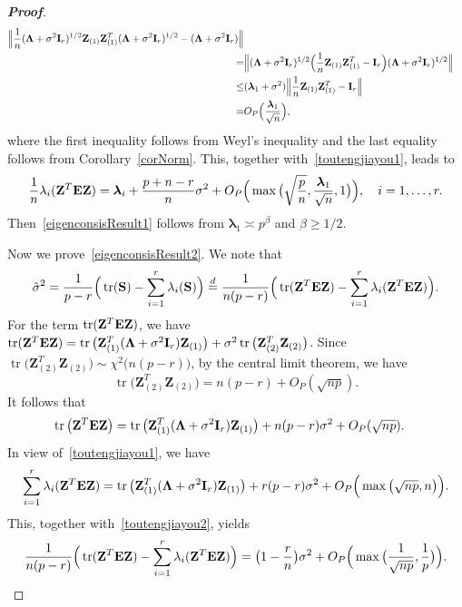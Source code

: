 \documentclass[3p]{elsarticle}
\DeclareMathOperator{\mytr}{tr}
\newcommand{\bZ}{\mathbf{Z}}
\newcommand{\bfsym}[1]{\ensuremath{\boldsymbol{#1}}}
\def\blambda {\bfsym {\lambda}}        \def\bLambda {\bfsym {\Lambda}}
\theoremstyle{plain}
\theoremstyle{definition}
\theoremstyle{remark}
\begin{document}
\begin{appendices}
\begin{proof}[\textbf{Proof}]
$$\begin{aligned}
        \Big\|
        \frac{1}{n}(\bLambda+\sigma^2 \BI_r)^{1/2}\bZ_{(1)}\bZ_{(1)}^T(\bLambda+\sigma^2 \BI_r)^{1/2}
        -(\bLambda+\sigma^2 \BI_r)
        \Big\|\\
        = &
        \Big\|
        (\bLambda+\sigma^2 \BI_r)^{1/2}\Big(\frac{1}{n}\bZ_{(1)}\bZ_{(1)}^T-\BI_r\Big)(\bLambda+\sigma^2 \BI_r)^{1/2}
        \Big\|\\
        \leq &
        (\blambda_1 + \sigma^2)
        \Big\|\frac{1}{n}\bZ_{(1)}\bZ_{(1)}^T-\BI_r\Big\|\\
        = &
        O_P\Big(\frac{\blambda_1}{\sqrt{n}}\Big),
    \end{aligned}
    $$
    where the first inequality follows from Weyl's inequality and the last equality follows from Corollary~\ref{corNorm}.
    This, together with~\eqref{toutengjiayou1}, leads to
$$
\frac{1}{n}\lambda_i(\BZ^T \BE \BZ)=
\blambda_i+\frac{p+n-r}{n}\sigma^2+O_P\Big(\max\big(\sqrt{\frac{p}{n}},\frac{\blambda_1}{\sqrt{n}},1\big)\Big),\quad i=1,\ldots, r.
$$
Then~\eqref{eigenconsisResult1} follows from $\blambda_1\asymp p^{\beta}$ and $\beta\geq 1/2$.
    
    Now we prove~\eqref{eigenconsisResult2}.
    We note that
    $$
    \hat{\sigma}^2=\frac{1}{p-r}\Big(\mytr(\BS)-\sum_{i=1}^r \lambda_i(\BS)\Big)
    \overset{d}{=}
\frac{1}{n(p-r)}\Big(\mytr(\BZ^T \BE \BZ)-\sum_{i=1}^r \lambda_i(\BZ^T \BE \BZ)\Big).
    $$
    For the term $\mytr(\BZ^T \BE \BZ)$, we have
    $
            \mytr(\bZ^T \BE \bZ)= \mytr\big(\bZ_{(1)}^T (\bLambda +\sigma^2 \BI_r) \bZ_{(1)}\big)+
       \sigma^2 \mytr\big( \bZ_{(2)}^T  \bZ_{(2)}\big)
    $.
    Since $\mytr\big( \bZ_{(2)}^T  \bZ_{(2)}\big)\sim \chi^2\big( n(p-r)\big)$, by the central limit theorem, we have
    $$\mytr\big( \bZ_{(2)}^T  \bZ_{(2)}\big)=n(p-r)+O_P(\sqrt{np}).$$
    It follows that
    \begin{equation}\label{toutengjiayou2}
        \begin{aligned}
            \mytr\big(\bZ^T \BE \bZ\big)&= \mytr\big(\bZ_{(1)}^T (\bLambda +\sigma^2 \BI_r) \bZ_{(1)}\big)+
            n(p-r)\sigma^2+O_P(\sqrt{np}).
        \end{aligned}
    \end{equation}
    In view of~\eqref{toutengjiayou1}, we have
    $$
\sum_{i=1}^r\lambda_i(\BZ^T \BE \BZ)
=\mytr\big(\BZ_{(1)}^T (\bLambda+\sigma^2 \BI_r)\BZ_{(1)}\big)
+r(p-r)\sigma^2
+
O_P\Big(\max\big(\sqrt{np},n\big)\Big).
    $$
    This, together with~\eqref{toutengjiayou2}, yields
    $$
\frac{1}{n(p-r)}\Big(\mytr(\BZ^T \BE \BZ)-\sum_{i=1}^r \lambda_i(\BZ^T \BE \BZ)\Big)=
\big(1-\frac{r}{n}\big)\sigma^2+
O_P\Big(\max\big(\frac{1}{\sqrt{np}},\frac{1}{p}\big)\Big).
    $$
\end{proof}


\end{appendices}
\end{document}
